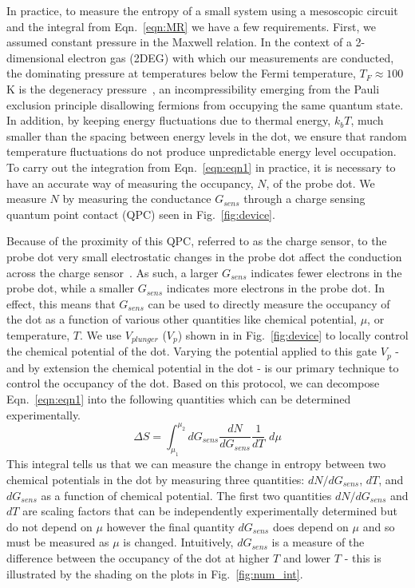 In practice, to measure the entropy of a small system using a mesoscopic circuit and the integral from Eqn.~\ref{eqn:MR} we have a few requirements. First, we assumed constant pressure in the Maxwell relation. In the context of a 2-dimensional electron gas (2DEG) with which our measurements are conducted, the dominating pressure at temperatures below the Fermi temperature, $T_F \approx 100$K is the degeneracy pressure~\cite{ashcroftmermin}, an incompressibility emerging from the Pauli exclusion principle disallowing fermions from occupying the same quantum state. In addition, by keeping energy fluctuations due to thermal energy, $k_bT$, much smaller than the spacing between energy levels in the dot, we ensure that random temperature fluctuations do not produce unpredictable energy level occupation.
To carry out the integration from Eqn.~\ref{eqn:eqn1} in practice, it is necessary to have an accurate way of measuring the occupancy, $N$, of the probe dot. We measure $N$ by measuring the conductance $G_{sens}$ through a charge sensing quantum point contact (QPC) seen in Fig.~\ref{fig:device}. 

Because of the proximity of this QPC, referred to as the charge sensor, to the probe dot very small electrostatic changes in the probe dot affect the conduction across the charge sensor~\cite{spintocharge}. As such, a larger $G_{sens}$ indicates fewer electrons in the probe dot, while a smaller $G_{sens}$ indicates more electrons in the probe dot. In effect, this means that $G_{sens}$ can be used to directly measure the occupancy of the dot as a function of various other quantities like chemical potential, $\mu$, or temperature, $T$. We use $V_{plunger}$ ($V_p$) shown in in Fig.~\ref{fig:device} to locally control the chemical potential of the dot. Varying the potential applied to this gate $V_p$ - and by extension the chemical potential in the dot - is our primary technique to control the occupancy of the dot. Based on this protocol, we can decompose Eqn.~\ref{eqn:eqn1} into the following quantities which can be determined experimentally.
\begin{equation}
	\label{eqn:eqn2}
	\Delta S = \int_{\mu_1}^{\mu_2} d G_{sens}\frac{dN}{dG_{sens}} \frac{1}{dT} \,\,  d \mu
\end{equation}
This integral tells us that we can measure the change in entropy between two chemical potentials in the dot by measuring three quantities: $dN/dG_{sens}$, $dT$, and $dG_{sens}$ as a function of chemical potential. The first two quantities $dN/dG_{sens}$ and $dT$ are scaling factors that can be independently experimentally determined but do not depend on $\mu$ however the final quantity $dG_{sens}$ does depend on $\mu$ and so must be measured as $\mu$ is changed. Intuitively, $dG_{sens}$ is a measure of the difference between the occupancy of the dot at higher $T$ and lower $T$ - this is illustrated by the shading on the plots in Fig.~\ref{fig:num_int}. 


